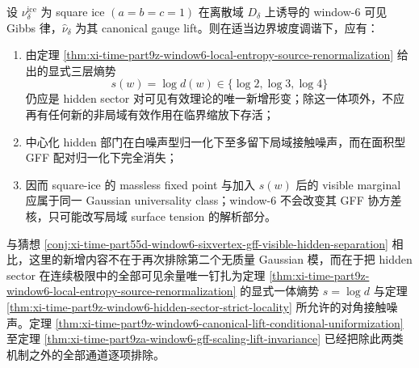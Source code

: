 \begin{conjecture}\label{conj:xi-time-part9za-square-ice-window6-local-entropy-renormalization}
设 \(\nu_\delta^{\mathrm{ice}}\) 为 square ice \((a=b=c=1)\) 在离散域 \(D_\delta\) 上诱导的 window-\(6\) 可见 Gibbs 律，\(\widehat\nu_\delta\) 为其 canonical gauge lift。则在适当边界坡度调谐下，应有：
\begin{enumerate}
  \item 由定理 \ref{thm:xi-time-part9z-window6-local-entropy-source-renormalization} 给出的显式三层熵势
  \[
  s(w)=\log d(w)\in\{\log 2,\log 3,\log 4\}
  \]
  仍应是 hidden sector 对可见有效理论的唯一新增形变；除这一体项外，不应再有任何新的非局域有效作用在临界缩放下存活；
  \item 中心化 hidden 部门在白噪声型归一化下至多留下局域接触噪声，而在面积型 GFF 配对归一化下完全消失；
  \item 因而 square-ice 的 massless fixed point 与加入 \(s(w)\) 后的 visible marginal 应属于同一 Gaussian universality class；window-\(6\) 不会改变其 GFF 协方差核，只可能改写局域 surface tension 的解析部分。
\end{enumerate}
\end{conjecture}

\noindent
与猜想 \ref{conj:xi-time-part55d-window6-sixvertex-gff-visible-hidden-separation} 相比，这里的新增内容不在于再次排除第二个无质量 Gaussian 模，而在于把 hidden sector 在连续极限中的全部可见余量唯一钉扎为定理 \ref{thm:xi-time-part9z-window6-local-entropy-source-renormalization} 的显式一体熵势 \(s=\log d\) 与定理 \ref{thm:xi-time-part9z-window6-hidden-sector-strict-locality} 所允许的对角接触噪声。定理 \ref{thm:xi-time-part9z-window6-canonical-lift-conditional-uniformization} 至定理 \ref{thm:xi-time-part9za-window6-gff-scaling-lift-invariance} 已经把除此两类机制之外的全部通道逐项排除。

\endinput
